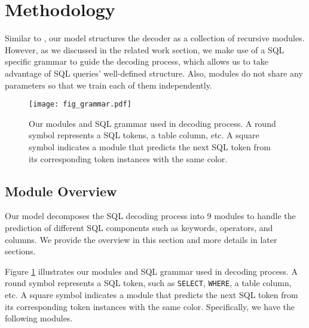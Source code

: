 \documentclass[11pt,a4paper]{article}
\begin{document}
\section{Methodology}
\label{sec:systems}

Similar to \cite{RabinovichSK17}, our model structures the decoder as a collection of recursive modules.
However, as we discussed in the related work section, we make use of a SQL specific grammar to guide the decoding process, which allows us to take advantage of SQL queries' well-defined structure. Also, modules do not share any parameters so that we train each of them independently.


\begin{figure}[!t]
    \vspace{-1.5mm}\hspace{-1mm}
    \centering
    \texttt{[image: fig\_grammar.pdf]}\vspace{-2mm}
    \caption{Our modules and SQL grammar used in decoding process. A round symbol represents a SQL tokens, a table column, etc. A square symbol indicates a module that predicts the next SQL token from its corresponding token instances with the same color.
    }
\label{fig:grammar}
\vspace{-2mm}
\end{figure}


\subsection{Module Overview}
\label{sec:module_overview}
Our model decomposes the SQL decoding process into 9 modules to handle the prediction of different SQL components such as keywords, operators, and columns. We provide the overview in this section and more details in later sections.

Figure \ref{fig:grammar} illustrates our modules and SQL grammar used in decoding process. A round symbol represents a SQL token, such as \texttt{SELECT}, \texttt{WHERE}, a table column, etc.
A square symbol indicates a module that predicts the next SQL token from its corresponding token instances with the same color.
Specifically, we have the following modules. \vspace{-2mm}
\end{document}

